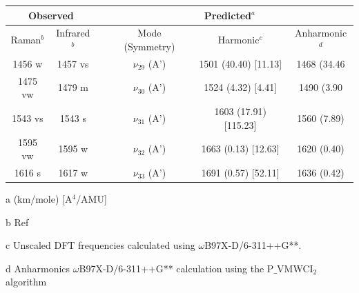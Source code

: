 \begin{table}[H]
	\begin{center}
		\begin{threeparttable}
			\begin{tabular}{c c c c c c}
				\hline
				\multicolumn{ 2}{c}{Observed} & \multicolumn{1}{c}{} & \multicolumn{ 3}{c}{Predicted$^{a}$} \\ \hline
				Raman$^{b}$ & \multicolumn{1}{c}{Infrared$^{b}$} &  & \multicolumn{1}{c}{Mode (Symmetry)} & \multicolumn{1}{c}{Harmonic$^{c}$} & Anharmonic$^{d}$ \\ \hline
 1456 w & 1457 vs &  & $\nu_{29}$ (A’) & 1501 (40.40) [11.13] &  1468 (34.46 \\ 
 1475 vw & 1479 m &  & $\nu_{30}$ (A’) & 1524 (4.32) [4.41] & 
 1490 (3.90 \\ 
 1543 vs & 1543 s &  & $\nu_{31}$ (A’)&1603 (17.91) [115.23] & 1560 (7.89) \\ 
 1595 vw & 1595 w & \multicolumn{1}{c}{} & $\nu_{32}$ (A’)
 & 1663 (0.13) [12.63] & 1620 (0.40) \\ 
 1616 s & 1617 w & \multicolumn{1}{c}{} & $\nu_{33}$ (A’) & 1691 (0.57) [52.11]& 1636 (0.42)\\
 \hline
\end{tabular}

\begin{tablenotes}
	\item[a] (km/mole) [A$^{4}$/AMU]
	\item[b] Ref \cite{singh2006ab}
	\item[c] Unscaled DFT frequencies calculated using $\omega$B97X-D/6-311++G**.
	\item[d] Anharmonics $\omega$B97X-D/6-311++G** calculation using the P$\_$VMWCI$_{2}$ algorithm
\end{tablenotes}
\end{threeparttable}
\end{center}
\label{freq-Benzofuran}
\end{table}




